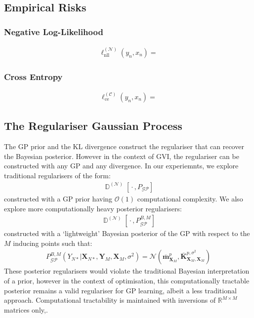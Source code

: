\documentclass{article}
\newcommand{\D}{\operatorname{\mathbb{D}}}
\newcommand{\GP}{\operatorname{\mathcal{GP}}}
\newcommand{\wc}{\operatorname{{}\cdot{}}}
\numberwithin{equation}{section}
\begin{document}
\subsection{Empirical Risks}
\subsubsection{Negative Log-Likelihood}
\begin{align}
    \ell_{\text{nll}}^{(\mathcal{N})}(y_n, x_n) = 
\end{align}
\subsubsection{Cross Entropy}
\begin{align}
    \ell_{\text{ce}}^{(\mathcal{C})}(y_n, x_n) = 
\end{align}
\subsection{The Regulariser Gaussian Process}
The GP prior and the KL divergence construct the regulariser that can recover the Bayesian posterior. However in the context of GVI, the regulariser can be constructed with any GP and any divergence. In our experiemnts, we explore traditional regularisers of the form:
\begin{align}
    \D^{(\mathcal{N})}\left[\wc, P_{\GP}\right]
    \label{prior-regulariser}
\end{align}
constructed with a GP prior having $\mathcal{O}(1)$ computational complexity. We also explore more computationally heavy posterior regularisers:
\begin{align}
    \D^{(\mathcal{N})}\left[\wc, P^{B, M}_{\GP}\right]
    \label{posterior-regulariser}
\end{align}
constructed with a `lightweight' Bayesian posterior of the GP with respect to the $M$ inducing points such that:
\begin{align}
    P^{B, M}_{\GP}\left(Y_{N*} \vert \mathbf{X}_{N*}, \mathbf{Y}_M, \mathbf{X}_M, \sigma^2\right) = \mathcal{N}\left(\bar{\mathbf{m}}_{\mathbf{X}_M}^p, \bar{\mathbf{K}}_{\mathbf{X}_M, \mathbf{X}_M}^{p, \sigma^2}\right)
\end{align}
These posterior regularisers would violate the traditional Bayesian interpretation of a prior, however in the context of optimisation, this computationally tractable posterior remains a valid regulariser for GP learning, albeit a less traditional approach. Computational tractability is maintained with inversions of $\mathbb{R}^{M\times M}$ matrices only,.
\end{document}
